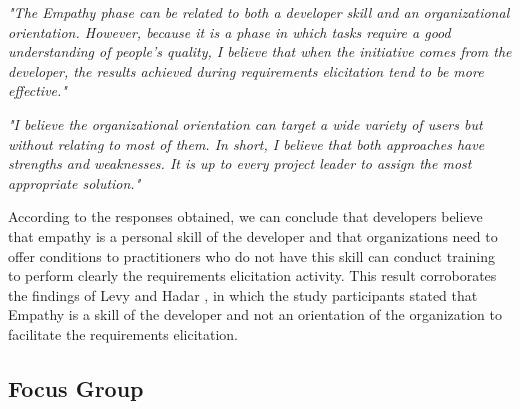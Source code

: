 \documentclass[conference]{IEEEtran}
\begin{document}
\begin{mq}
\emph{"The Empathy phase can be related to both a developer skill and an organizational orientation. However, because it is a phase in which tasks require a good understanding of people's quality, I believe that when the initiative comes from the developer, the results achieved during requirements elicitation tend to be more effective."}
\end{mq}

\begin{mq}
\emph{"I believe the organizational orientation can target a wide variety of users but without relating to most of them. In short, I believe that both approaches have strengths and weaknesses. It is up to every project leader to assign the most appropriate solution."}
\end{mq}


According to the responses obtained, we can conclude that developers believe that empathy is a personal skill of the developer and that organizations need to offer conditions to practitioners who do not have this skill can conduct training to perform clearly the requirements elicitation activity. This result corroborates the findings of Levy and Hadar \cite{DBLP:conf/re/LevyH18}, in which the study participants stated that Empathy is a skill of the developer and not an orientation of the organization to facilitate the requirements elicitation.

\subsection{Focus Group}
\end{document}
